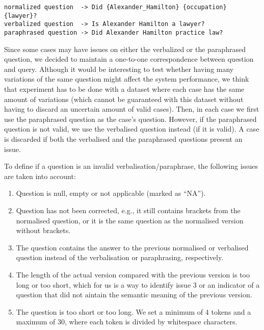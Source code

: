 \begin{lstlisting}[captionpos=b, 
    caption=Example of questions contained in one case of the LC-QuAD 2 dataset., 
    label=lst:questionExampleLcquad2,
    basicstyle=\ttfamily,frame=single]
normalized question  -> Did {Alexander_Hamilton} {occupation} {lawyer}?
verbalized question  -> Is Alexander Hamilton a lawyer?
paraphrased question -> Did Alexander Hamilton practice law?
\end{lstlisting}

Since some cases may have issues on either the verbalized or the paraphrased question, we 
decided to maintain a one-to-one correspondence between question and query. Although it would 
be interesting to test whether having many variations of the same question might affect the 
system performance, we think that experiment has to be done with a dataset where each case has 
the same amount of variations (which cannot be guaranteed with this dataset without having to 
discard an uncertain amount of valid cases). Then, in each case we first use the paraphrased 
question as the case’s question. However, if the paraphrased question is not valid, we use the 
verbalised question instead (if it is valid). A case is discarded if both the verbalised and 
the paraphrased questions present an issue.

To define if a question is an invalid verbalisation/paraphrase, the following issues are taken 
into account:

\begin{enumerate}
    \item Question is null, empty or not applicable (marked as “NA”). 
    \item Question has not been corrected, e.g., it still contains brackets from the normalised 
    question, or it is the same question as the normalised version without brackets.
    \item The question contains the answer to the previous normalised or verbalised question 
    instead of the verbalisation or paraphrasing, respectively. 
    \item The length of the actual version compared with the previous version is too long or too 
    short, which for us is a way to identify issue 3 or an indicator of a question that did not 
    aintain the semantic meaning of the previous version.
    \item The question is too short or too long. We set a minimum of 4 tokens and a maximum of 
    30, where each token is divided by whitespace characters.
\end{enumerate}


